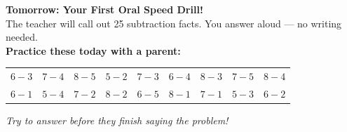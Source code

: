 \documentclass[12pt, letterpaper]{article}
\begin{document}
\bigskip\bigskip

\begin{mdframed}[backgroundcolor=sd-gold!15,linecolor=sd-gold,linewidth=1.5pt,roundcorner=4pt,
  innerleftmargin=10pt,innerrightmargin=10pt,innertopmargin=8pt,innerbottommargin=8pt]
\textbf{\color{sd-gold}Tomorrow: Your First Oral Speed Drill!}\\[5pt]
The teacher will call out 25 subtraction facts. You answer aloud — no writing needed.\\[4pt]
\textbf{Practice these today with a parent:}
\begin{center}
\begin{tabular}{*{9}{c}}
$6-3$ & $7-4$ & $8-5$ & $5-2$ & $7-3$ & $6-4$ & $8-3$ & $7-5$ & $8-4$\\[4pt]
$6-1$ & $5-4$ & $7-2$ & $8-2$ & $6-5$ & $8-1$ & $7-1$ & $5-3$ & $6-2$
\end{tabular}
\end{center}
\textit{Try to answer before they finish saying the problem!}
\end{mdframed}
\end{document}
